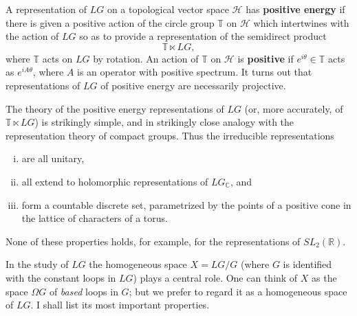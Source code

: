 \documentclass[12pt]{article}
\begin{document}
    \begin{definition}
        A representation of \(LG\) on a topological vector space \(\mathcal H\) has \textbf{positive energy} if there is given a positive action of the circle group \(\mathbb{T}\) on \(\mathcal H\) which intertwines with the action of \(LG\) so as to provide a representation of the semidirect product
\[
\mathbb{T} \ltimes LG,
\]where \(\mathbb{T}\) acts on \(LG\) by rotation. An action of \(\mathbb{T}\) on \(\mathcal H\) is \textbf{positive} if \(e^{i\theta} \in \mathbb{T}\) acts as \(e^{iA\theta}\), where \(A\) is an operator with positive spectrum. It turns out that representations of \(LG\) of positive energy are necessarily projective.
    \end{definition}


The theory of the positive energy representations of \(LG\) (or, more accurately, of \(\mathbb{T} \ltimes LG\)) is strikingly simple, and in strikingly close analogy with the representation theory of compact groups. Thus the irreducible representations
\begin{enumerate}[(i)]
\item are all unitary,
\item all extend to holomorphic representations of \(LG_\mathbb{C}\), and
\item form a countable discrete set, parametrized by the points of a positive cone in the lattice of characters of a torus.
\end{enumerate}
None of these properties holds, for example, for the representations of \(SL_2(\mathbb{R})\).

In the study of \(LG\) the homogeneous space \(X = LG/G\) (where \(G\) is identified with the constant loops in \(LG\)) plays a central role.  
One can think of \(X\) as the space \(\Omega G\) of \emph{based} loops in \(G\); but we prefer to regard it as a homogeneous space of \(LG\).  
I shall list its most important properties.
\end{document}
